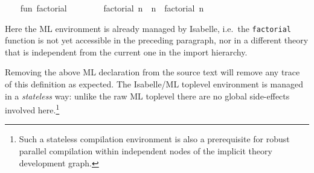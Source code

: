 \begin{isabellebody}
{\isafoldmlex}%
%
\isadelimmlex
%
\endisadelimmlex
%
\isadelimML
%
\endisadelimML
%
\isatagML
{}\isamarkupfalse%
\ {}\isanewline
\ \ fun\ factorial\ {}\ {}\ {}\isanewline
\ \ \ \ {}\ factorial\ n\ {}\ n\ {}\ factorial\ {}n\ {}\ {}{}\isanewline
{}%
\endisatagML
{\isafoldML}%
%
\isadelimML
%
\endisadelimML
%
\begin{isamarkuptext}%
Here the ML environment is already managed by Isabelle, i.e.\
  the \verb|factorial| function is not yet accessible in the preceding
  paragraph, nor in a different theory that is independent from the
  current one in the import hierarchy.

  Removing the above ML declaration from the source text will remove
  any trace of this definition as expected.  The Isabelle/ML toplevel
  environment is managed in a \emph{stateless} way: unlike the raw ML
  toplevel there are no global side-effects involved
  here.\footnote{Such a stateless compilation environment is also a
  prerequisite for robust parallel compilation within independent
  nodes of the implicit theory development graph.}


\end{isamarkuptext}
\end{isabellebody}
